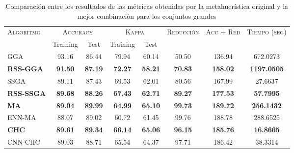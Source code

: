 \begin{table}[h!]
\centering
\begin{adjustbox}{max width =\textwidth}
\begin{tabular}{l c c c c c c c}
\hline
\multirow{2}{*}{\textsc{Algoritmo}}
	& \multicolumn{2}{c}{\textsc{Accuracy}}
	& \multicolumn{2}{c}{\textsc{Kappa}}
	& \textsc{Reducción}
	& \textsc{Acc + Red}
	& \textsc{Tiempo (seg)} \\
	& Training & Test
	& Training & Test \\ 
\hline
\hline

GGA  & 93.16 & 86.44 & 79.94 & 60.14 & 50.50 & 136.94 & 672.0273 \\
\textbf{RSS-GGA}     & \textbf{91.50} & \textbf{87.19} & \textbf{72.27} & \textbf{58.21} & \textbf{70.83} & \textbf{158.02} & \textbf{1197.0505} \\

\hline

SSGA & 89.11 & 87.43 & 69.53 & 62.01 & 80.56 & 167.99 & 27.6637 \\
\textbf{RSS-SSGA} & \textbf{89.68} & \textbf{88.26} & \textbf{67.43} & \textbf{62.71} & \textbf{89.27} & \textbf{177.53} & \textbf{57.7995} \\

\hline

\textbf{MA}   & \textbf{89.04} & \textbf{89.99} & \textbf{64.99} & \textbf{65.10} & \textbf{99.73} & \textbf{189.72} & \textbf{256.1432} \\
ENN-MA & 88.07 & 89.02 & 60.72 & 61.45 & 99.76 & 188.78 & 288.6525 \\

\hline

\textbf{CHC}  & \textbf{89.61} & \textbf{89.34} & \textbf{66.14} & \textbf{65.06} & \textbf{96.15} & \textbf{185.76} & \textbf{16.8665} \\
CNN-CHC & 89.03 & 88.71 & 65.54 & 64.37 & 97.71 & 186.42 & 38.3314 \\

\hline
\end{tabular}
\end{adjustbox}
\caption{Comparación entre los resultados de las métricas obtenidas por la metahuerística original y la mejor combinación para los conjuntos grandes}
\label{large-best-all}

\end{table}

